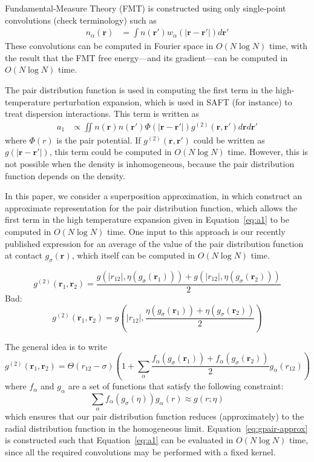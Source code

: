 \documentclass[letterpaper,twocolumn,amsmath,amssymb,pre]{revtex4-1}
\newcommand{\rr}{\textbf{r}}
\begin{document}
Fundamental-Measure Theory (FMT) is constructed using only single-point
convolutions (check terminology) such as
\begin{align}
  n_\alpha(\rr) &= \int n(\rr')w_\alpha(|\rr-\rr'|) d\rr'
\end{align}
These convolutions can be computed in Fourier space in $O(N\log N)$
time, with the result that the FMT free energy---and its
gradient---can be computed in $O(N\log N)$ time.

The pair distribution function is used in computing the first term in
the high-temperature perturbation expansion, which is used in SAFT
(for instance) to treat dispersion interactions.  This term is written
as
\begin{align}\label{eq:a1}
  a_1 &\propto \iint n(\rr)n(\rr') \Phi(|\rr-\rr'|)
  g^{(2)}(\rr,\rr')d\rr d\rr'
\end{align}
where $\Phi(r)$ is the pair potential.  If $g^{(2)}(\rr,\rr')$ could
be written as $g(|\rr-\rr'|)$, this term could be computed in $O(N\log
N)$ time.  However, this is not possible when the density is
inhomogeneous, because the pair distribution function depends on the
density.

In this paper, we consider a superposition approximation, in which
construct an approximate representation for the pair distribution
function, which allows the first term in the high temperature
expansion given in Equation~\ref{eq:a1} to be computed in $O(N\log N)$
time.  One input to this approach is our recently published expression
for an average of the value of the pair distribution function at
contact $g_\sigma(\rr)$, which itself can be computed in $O(N\log N)$
time.

\begin{dmath}
  g^{(2)}(\rr_1,\rr_2) = \frac{g(|r_{12}|, \eta(g_\sigma(\rr_1))) + g(|r_{12}|, \eta(g_\sigma(\rr_2)))}{2}
\end{dmath}
Bad:
\begin{dmath}
  g^{(2)}(\rr_1,\rr_2) = g\left(|r_{12}|, \frac{\eta(g_\sigma(\rr_1)) + \eta(g_\sigma(\rr_2))}{2}\right)
\end{dmath}

The general idea is to write
\begin{dmath}
  g^{(2)}(\rr_1,\rr_2) = \Theta(r_{12}-\sigma)
  \left(1 + \sum_{\alpha} \frac{f_{\alpha}(g_\sigma(\rr_1)) + f_{\alpha}(g_\sigma(\rr_2))}{2}g_{\alpha}(r_{12})\right)\label{eq:gpair-approx}
\end{dmath}
where $f_{\alpha}$ and $g_{\alpha}$ are a set of functions that
satisfy the following constraint:
\begin{dmath}\label{eq:definealpha}
  \sum_{\alpha} f_{\alpha}(g_\sigma(\eta)) g_{\alpha}(r) \approx g(r; \eta)
\end{dmath}
which ensures that our pair distribution function reduces
(approximately) to the radial distribution function in the homogeneous
limit.  Equation~\ref{eq:gpair-approx} is constructed such that
Equation~\ref{eq:a1} can be evaluated in $O(N\log N)$ time, since all
the required convolutions may be performed with a fixed kernel.
\end{document}

